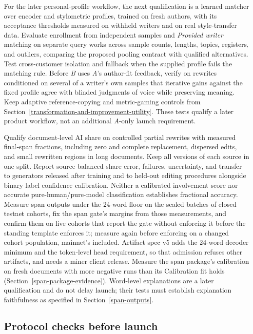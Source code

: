 For the later personal-profile workflow, the next qualification is a learned
matcher over encoder and stylometric profiles, trained on fresh authors, with
its acceptance thresholds measured on withheld writers and on real
style-transfer data. Evaluate enrollment from independent samples and
\emph{Provided writer} matching on separate query works across sample counts,
lengths, topics, registers, and outliers, comparing the proposed pooling
contract with qualified alternatives. Test cross-customer isolation and fallback when the supplied profile
fails the matching rule. Before \textit{B} uses \textit{A}'s author-fit feedback,
verify on rewrites conditioned on several of a writer's own samples that
iterative gains against the fixed profile agree with blinded judgments of voice
while preserving meaning. Keep adaptive reference-copying and metric-gaming
controls from Section~\ref{transformation-and-improvement-utility}. These tests
qualify a later product workflow, not an additional \textit{A}-only launch
requirement.

Qualify document-level AI share on controlled partial rewrites with measured
final-span fractions, including zero and complete replacement, dispersed edits,
and small rewritten regions in long documents. Keep all versions of each source
in one split. Report source-balanced share error, failures, uncertainty, and
transfer to generators released after training and to held-out editing
procedures alongside binary-label
confidence calibration. Neither a calibrated involvement score nor accurate
pure-human/pure-model classification establishes fractional accuracy.
Measure span outputs under the 24-word floor on the sealed batches of closed
testnet cohorts, fix the span gate's margins from those measurements, and
confirm them on live cohorts that report the gate without enforcing it before
the standing template enforces it; measure again before enforcing on a changed
cohort population, mainnet's included. Artifact spec v5 adds the 24-word
decoder minimum and the token-level head requirement, so that admission refuses
other artifacts, and needs a miner client release. Measure the span package's
calibration on fresh documents with more negative runs than its Calibration fit
holds (Section~\ref{span-package-evidence}).
Word-level
explanations are a later qualification and do not delay launch; their tests
must establish explanation faithfulness as specified in
Section~\ref{span-outputs}.

\subsection{Protocol checks before launch}\label{protocol-checks-before-launch}


